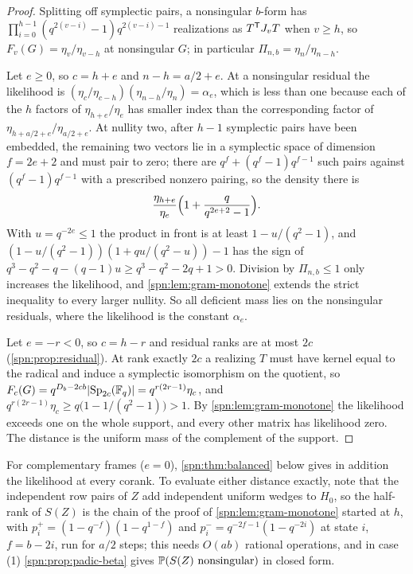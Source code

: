 \begin{proof}
Splitting off symplectic pairs, a nonsingular $b$-form has
$\prod_{i=0}^{h-1}(q^{2(v-i)}-1)q^{2(v-i)-1}$ realizations as $T^{\mathsf{T}}J_vT$ when $v\ge h$, so
$F_v(G)=\eta_v/\eta_{v-h}$ at nonsingular $G$; in particular $\Pi_{n,b}=\eta_n/\eta_{n-h}$.

Let $e\ge0$, so $c=h+e$ and $n-h=a/2+e$. At a nonsingular residual the likelihood is
$(\eta_c/\eta_{c-h})(\eta_{n-h}/\eta_n)=\alpha_e$, which is less than one because each of the $h$
factors of $\eta_{h+e}/\eta_e$ has smaller index than the corresponding factor of
$\eta_{h+a/2+e}/\eta_{a/2+e}$. At nullity two, after $h-1$ symplectic pairs have been embedded,
the remaining two vectors lie in a symplectic space of dimension $f=2e+2$ and must pair to zero;
there are $q^f+(q^f-1)q^{f-1}$ such pairs against $(q^f-1)q^{f-1}$ with a prescribed nonzero
pairing, so the density there is
\[
 \frac{\eta_{h+e}}{\eta_e}\Bigl(1+\frac{q}{q^{2e+2}-1}\Bigr).
\]
With $u=q^{-2e}\le1$ the product in front is at least $1-u/(q^2-1)$, and
$(1-u/(q^2-1))(1+qu/(q^2-u))-1$ has the sign of $q^3-q^2-q-(q-1)u\ge q^3-q^2-2q+1>0$. Division
by $\Pi_{n,b}\le1$ only increases the likelihood, and \cref{spn:lem:gram-monotone} extends the
strict inequality to every larger nullity. So all deficient mass lies on the nonsingular
residuals, where the likelihood is the constant $\alpha_e$.

Let $e=-r<0$, so $c=h-r$ and residual ranks are at most $2c$ (\cref{spn:prop:residual}). At rank
exactly $2c$ a realizing $T$ must have kernel equal to the radical and induce a symplectic
isomorphism on the quotient, so $F_c(G)=q^{D_b-2cb}\lvert\operatorname{Sp}_{2c}(\mathbb{F}_q)\rvert=q^{r(2r-1)}\eta_c$, and
$q^{r(2r-1)}\eta_c\ge q\bigl(1-1/(q^2-1)\bigr)>1$. By \cref{spn:lem:gram-monotone} the likelihood
exceeds one on the whole support, and every other matrix has likelihood zero. The distance is the
uniform mass of the complement of the support.
\end{proof}

For complementary frames ($e=0$), \cref{spn:thm:balanced} below gives in addition the
likelihood at every corank. To evaluate either distance exactly, note
that the independent row pairs of $Z$ add independent uniform wedges to $H_0$, so the half-rank of
$S(Z)$ is the chain of the proof of \cref{spn:lem:gram-monotone} started at $h$, with
$p_i^+=(1-q^{-f})(1-q^{1-f})$ and $p_i^-=q^{-2f-1}(1-q^{-2i})$ at state $i$, $f=b-2i$, run for $a/2$
steps; this needs $O(ab)$ rational operations, and in case (1) \cref{spn:prop:padic-beta} gives
$\mathbb{P}(S(Z)\text{ nonsingular})$ in closed form.

